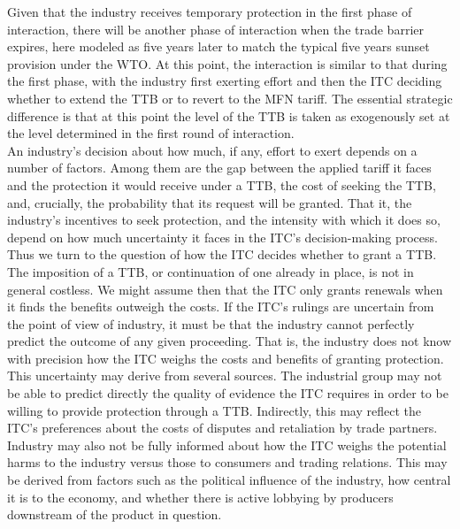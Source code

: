 \documentclass[12pt]{article}
\begin{document}
Given that the industry receives temporary protection in the first phase of interaction, there will be another phase of interaction when the trade barrier expires, here modeled as five years later to match the typical five years sunset provision under the WTO. At this point, the interaction is similar to that during the first phase, with the industry first exerting effort and then the ITC deciding whether to extend the TTB or to revert to the MFN tariff. The essential strategic difference is that at this point the level of the TTB is taken as exogenously set at the level determined in the first round of interaction. \\

An industry's decision about how much, if any, effort to exert depends on a number of factors. Among them are the gap between the applied tariff it faces and the protection it would receive under a TTB, the cost of seeking the TTB, and, crucially, the probability that its request will be granted. That it, the industry's incentives to seek protection, and the intensity with which it does so, depend on how much uncertainty it faces in the ITC's decision-making process. \\
 
Thus we turn to the question of how the ITC decides whether to grant a TTB. The imposition of a TTB, or continuation of one already in place, is not in general costless. We might assume then that the ITC only grants renewals when it finds the benefits outweigh the costs. If the ITC's rulings are uncertain from the point of view of industry, it must be that the industry cannot perfectly predict the outcome of any given proceeding. That is, the industry does not know with precision how the ITC weighs the costs and benefits of granting protection.\\

This uncertainty may derive from several sources. The industrial group may not be able to predict directly the quality of evidence the ITC requires in order to be willing to provide protection through a TTB. Indirectly, this may reflect the ITC's preferences about the costs of disputes and retaliation by trade partners. Industry may also not be fully informed about how the ITC weighs the potential harms to the industry versus those to consumers and trading relations. This may be derived from factors such as the political influence of the industry, how central it is to the economy, and whether there is active lobbying by producers downstream of the product in question. \\
\end{document}
